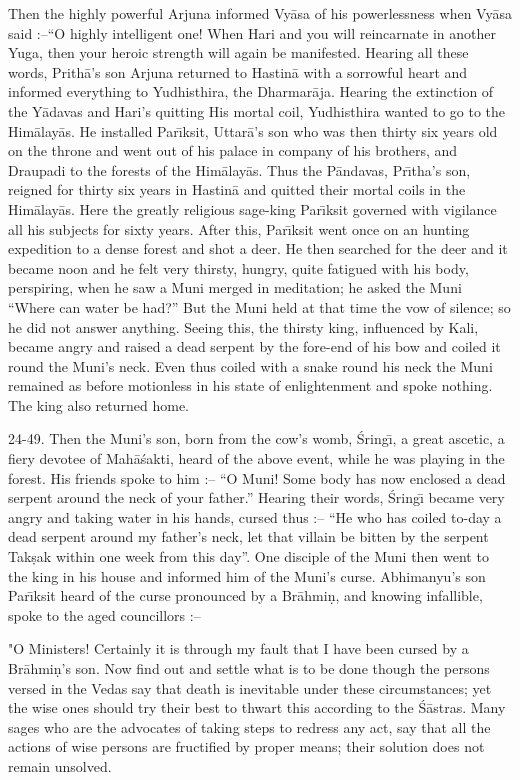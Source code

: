 Then the highly powerful Arjuna informed Vy\=asa of his powerlessness when Vy\=asa said :--``O highly intelligent one! When Hari and you will reincarnate in another Yuga, then your heroic strength will again be manifested. Hearing all these words, Prith\=a's son Arjuna returned to Hastin\=a with a sorrowful heart and informed everything to Yudhisthira, the Dharmar\=aja. Hearing the extinction of the Y\=adavas and Hari's quitting His mortal coil, Yudhisthira wanted to go to the Him\=alay\=as. He installed Par\={\i}ksit, Uttar\=a's son who was then thirty six years old on the throne and went out of his palace in company of his brothers, and Draupadi to the forests of the Him\=alay\=as. Thus the P\=andavas, Pr\={\i}tha's son, reigned for thirty six years in Hastin\=a and quitted their mortal coils in the Him\=alay\=as. Here the greatly religious sage-king Par\={\i}ksit governed with vigilance all his subjects for sixty years. After this, Par\={\i}ksit went once on an hunting expedition to a dense forest and shot a deer. He then searched for the deer and it became noon and he felt very thirsty, hungry, quite fatigued with his body, perspiring, when he saw a Muni merged in meditation; he asked the Muni ``Where can water be had?'' But the Muni held at that time the vow of silence; so he did not answer anything. Seeing this, the thirsty king, influenced by Kali, became angry and raised a dead serpent by the fore-end of his bow and coiled it round the Muni's neck. Even thus coiled with a snake round his neck the Muni remained as before motionless in his state of enlightenment and spoke nothing. The king also returned home.

24-49. Then the Muni's son, born from the cow's womb, \'Sring\={\i}, a great ascetic, a fiery devotee of Mah\=a\'sakti, heard of the above event, while he was playing in the forest. His friends spoke to him :-- ``O Muni! Some body has now enclosed a dead serpent around the neck of your father.'' Hearing their words, \'Sring\={\i} became very angry and taking water in his hands, cursed thus :-- ``He who has coiled to-day a dead serpent around my father's neck, let that villain be bitten by the serpent Tak\d{s}ak within one week from this day''. One disciple of the Muni then went to the king in his house and informed him of the Muni's curse. Abhimanyu's son Par\={\i}ksit heard of the curse pronounced by a Br\=ahmi\d{n}, and knowing infallible, spoke to the aged councillors :--

"O Ministers! Certainly it is through my fault that I have been cursed by a Br\=ahmi\d{n}'s son. Now find out and settle what is to be done though the persons versed in the Vedas say that death is inevitable under these circumstances; yet the wise ones should try their best to thwart this according to the \'S\=astras. Many sages who are the advocates of taking steps to redress any act, say that all the actions of wise persons are fructified by proper means; their solution does not remain unsolved.

